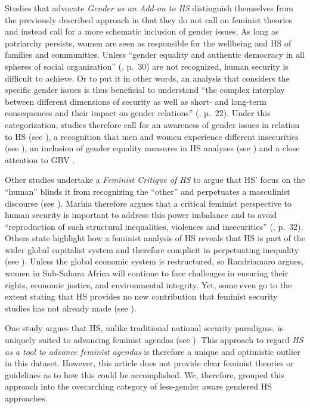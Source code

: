 \documentclass[10pt,a4paper]{article}
\begin{document}
\begin{multicols}{2}
Studies that advocate \textit{Gender as an Add-on to HS} distinguish themselves from the previously described approach in that they do not call on feminist theories and instead call for a more schematic inclusion of gender issues. As long as patriarchy persists, women are seen as responsible for the wellbeing and HS of families and communities. Unless ``gender equality and authentic democracy in all spheres of social organization'' (\citep{R38}, p.~30) are not recognized, human security is difficult to achieve. Or to put it in other words, an analysis that considers the specific gender issues is thus beneficial to understand ``the complex interplay between different dimensions of security as well as short- and long-term consequences and their impact on gender relations'' (\citep{R39}, p.~22). Under this categorization, studies therefore call for an awareness of gender issues in relation to HS (see \citep{R25}), a recognition that men and women experience different insecurities (see \citep{R24}), an inclusion of gender equality measures in HS analyses (see \citep{R40}) and a close attention to GBV \citep{R38,R41}.

Other studies undertake a \textit{Feminist Critique of HS} to argue that HS' focus on the ``human'' blinds it from recognizing the ``other'' and perpetuates a masculinist discourse (see \citep{R42}). Marhia \citep{R4} therefore argues that a critical feminist perspective to human security is important to address this power imbalance and to avoid ``reproduction of such structural inequalities, violences and insecurities'' (\citep{R4}, p.~32).  Others state highlight how a feminist analysis of HS reveals that HS is part of the wider global capitalist system and therefore complicit in perpetuating inequality (see \citep{R21,R43}). Unless the global economic system is restructured, so Randriamaro \citep{R43} argues, women in Sub-Sahara Africa will continue to face challenges in ensuring their rights, economic justice, and environmental integrity. Yet, some even go to the extent stating that HS provides no new contribution that feminist security studies has not already made (see \citep{R16}).

One study argues that HS, unlike traditional national security paradigms, is uniquely suited to advancing feminist agendas (see \citep{R44}). This approach to regard \textit{HS as a tool to advance feminist agendas} is therefore a unique and optimistic outlier in this dataset. However, this article does not provide clear feminist theories or guidelines as to how this could be accomplished. We, therefore, grouped this approach into the overarching category of less-gender aware gendered HS approaches.


\end{multicols}
\end{document}

